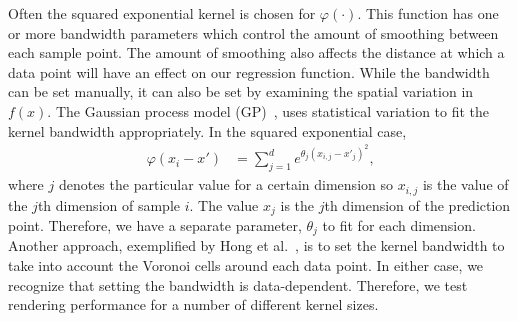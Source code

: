 Often the squared exponential kernel is chosen for $\varphi(\cdot)$. This 
function has one
or more bandwidth parameters which control the amount of smoothing between 
each sample
point. The amount of smoothing also affects the distance at which a data point
will have an effect on our regression function. While the bandwidth can be
set manually, it can also be set by examining the spatial variation in $f(x)$.
The Gaussian process model (GP)~\cite{Rasmussen:2006}, uses statistical 
variation
to fit the kernel bandwidth appropriately. 
In the squared exponential case,
\begin{align}
  \varphi(x_i - x') &= \sum_{j=1}^d e^{\theta_j (x_{i,j} - x'_j)^2}\text{,}
\end{align}
where $j$ denotes the particular value for a certain dimension so $x_{i,j}$ 
is the value of the $j$th dimension of sample $i$. The value $x_j$ is
the $j$th dimension of the prediction point.
Therefore,
we have a separate parameter, $\theta_j$ to fit for each dimension.
Another approach,
exemplified by Hong et al.~\cite{Hong:2006}, is to set the kernel bandwidth to
take into account the Voronoi cells around each data point. In either case,
we recognize that
setting the bandwidth is data-dependent. Therefore, we test rendering performance for a
number of different kernel sizes.


